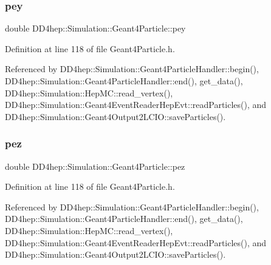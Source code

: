 \subsubsection{\texorpdfstring{pey}{pey}}
{\footnotesize\ttfamily double D\+D4hep\+::\+Simulation\+::\+Geant4\+Particle\+::pey}



Definition at line 118 of file Geant4\+Particle.\+h.



Referenced by D\+D4hep\+::\+Simulation\+::\+Geant4\+Particle\+Handler\+::begin(), D\+D4hep\+::\+Simulation\+::\+Geant4\+Particle\+Handler\+::end(), get\+\_\+data(), D\+D4hep\+::\+Simulation\+::\+Hep\+M\+C\+::read\+\_\+vertex(), D\+D4hep\+::\+Simulation\+::\+Geant4\+Event\+Reader\+Hep\+Evt\+::read\+Particles(), and D\+D4hep\+::\+Simulation\+::\+Geant4\+Output2\+L\+C\+I\+O\+::save\+Particles().

\hypertarget{class_d_d4hep_1_1_simulation_1_1_geant4_particle_a83de70580c139f049a057c0e185812d1}{}\label{class_d_d4hep_1_1_simulation_1_1_geant4_particle_a83de70580c139f049a057c0e185812d1} 
\subsubsection{\texorpdfstring{pez}{pez}}
{\footnotesize\ttfamily double D\+D4hep\+::\+Simulation\+::\+Geant4\+Particle\+::pez}



Definition at line 118 of file Geant4\+Particle.\+h.



Referenced by D\+D4hep\+::\+Simulation\+::\+Geant4\+Particle\+Handler\+::begin(), D\+D4hep\+::\+Simulation\+::\+Geant4\+Particle\+Handler\+::end(), get\+\_\+data(), D\+D4hep\+::\+Simulation\+::\+Hep\+M\+C\+::read\+\_\+vertex(), D\+D4hep\+::\+Simulation\+::\+Geant4\+Event\+Reader\+Hep\+Evt\+::read\+Particles(), and D\+D4hep\+::\+Simulation\+::\+Geant4\+Output2\+L\+C\+I\+O\+::save\+Particles().

\hypertarget{class_d_d4hep_1_1_simulation_1_1_geant4_particle_abe2efb370153a1466b9fa5dd61a04f9a}{}\label{class_d_d4hep_1_1_simulation_1_1_geant4_particle_abe2efb370153a1466b9fa5dd61a04f9a} 
